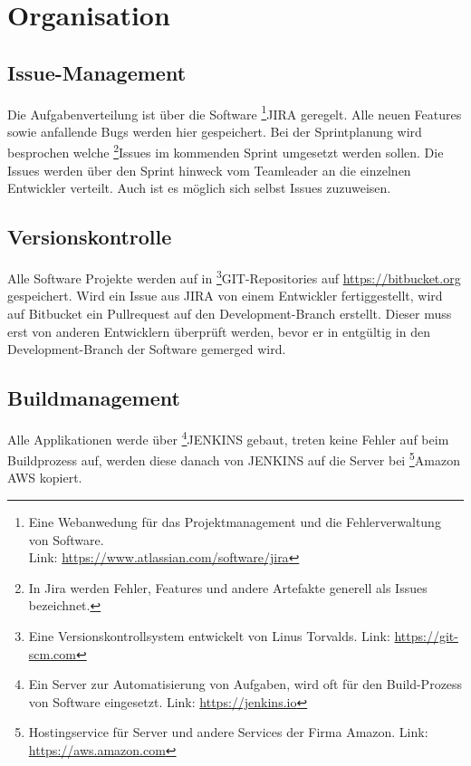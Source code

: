 \documentclass[chapterprefix=false, 12pt, a4paper, oneside, parskip=half, listof=totoc, bibliography=totoc, numbers=noendperiod]{scrbook}
\begin{document}
    \section{Organisation}

    \subsection{Issue-Management}

    Die Aufgabenverteilung ist über die Software \footnote{Eine Webanwedung für das Projektmanagement und die Fehlerverwaltung von Software. \\ Link: \url{https://www.atlassian.com/software/jira}}JIRA geregelt.
    Alle neuen Features sowie anfallende Bugs werden hier gespeichert.
    Bei der Sprintplanung wird besprochen welche \footnote{In Jira werden Fehler, Features und andere Artefakte generell als Issues bezeichnet.}Issues
    im kommenden Sprint umgesetzt werden sollen. Die Issues werden über den Sprint hinweck vom Teamleader an die einzelnen Entwickler verteilt. Auch ist es möglich sich selbst Issues zuzuweisen.

    \pagebreak

    \subsection{Versionskontrolle}

    Alle Software Projekte werden auf in \footnote{Eine Versionskontrollsystem entwickelt von Linus Torvalds. Link: \url{https://git-scm.com}}GIT-Repositories auf \url{https://bitbucket.org} gespeichert. Wird ein Issue aus JIRA von einem
    Entwickler fertiggestellt, wird auf Bitbucket ein Pullrequest auf den Development-Branch erstellt. Dieser muss erst von anderen Entwicklern überprüft werden, bevor er in entgültig in den Development-Branch der Software
    gemerged wird.

    \subsection{Buildmanagement}

    Alle Applikationen werde über \footnote{Ein Server zur Automatisierung von Aufgaben, wird oft für den Build-Prozess von Software eingesetzt. Link: \url{https://jenkins.io}}JENKINS gebaut,
    treten keine Fehler auf beim Buildprozess auf, werden diese danach von JENKINS auf die Server bei \footnote{Hostingservice für Server und andere Services der Firma Amazon. Link: \url{https://aws.amazon.com}}Amazon AWS kopiert.
\end{document}
